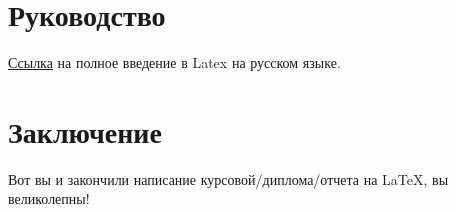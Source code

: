 \section{Руководство}
\href{https://www.texlive.info/CTAN/info/lshort/russian/lshortru.pdf}{Ссылка} на полное введение в Latex на русском языке.


\newpage
\section{Заключение}
Вот вы и закончили написание курсовой/диплома/отчета на \LaTeX, вы великолепны!


